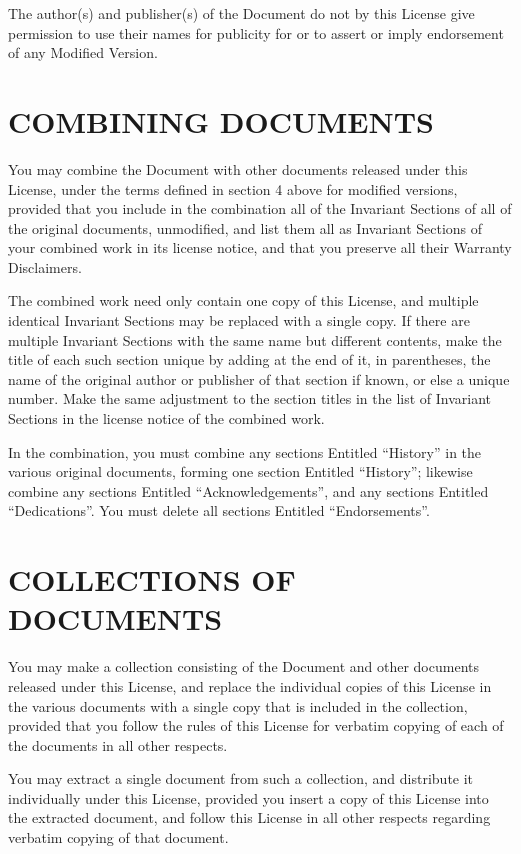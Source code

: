 The author(s) and publisher(s) of the Document do not by this License give permission to
use their names for publicity for or to assert or imply endorsement of any Modified Version.


\section{COMBINING DOCUMENTS}
You may combine the Document with other documents released under this License, under
the terms defined in section 4 above for modified versions, provided that you include in the
combination all of the Invariant Sections of all of the original documents, unmodified, and list
them all as Invariant Sections of your combined work in its license notice, and that you preserve
all their Warranty Disclaimers.

The combined work need only contain one copy of this License, and multiple identical
Invariant Sections may be replaced with a single copy. If there are multiple Invariant Sections
with the same name but different contents, make the title of each such section unique by adding
at the end of it, in parentheses, the name of the original author or publisher of that section if
known, or else a unique number. Make the same adjustment to the section titles in the list of
Invariant Sections in the license notice of the combined work.

In the combination, you must combine any sections Entitled ``History'' in the various original
documents, forming one section Entitled ``History''; likewise combine any sections Entitled
``Acknowledgements'', and any sections Entitled ``Dedications''. You must delete all sections
Entitled ``Endorsements''.


\section{COLLECTIONS OF DOCUMENTS}
You may make a collection consisting of the Document and other documents released under
this License, and replace the individual copies of this License in the various documents with a
single copy that is included in the collection, provided that you follow the rules of this License
for verbatim copying of each of the documents in all other respects.

You may extract a single document from such a collection, and distribute it individually
under this License, provided you insert a copy of this License into the extracted document, and
follow this License in all other respects regarding verbatim copying of that document.


